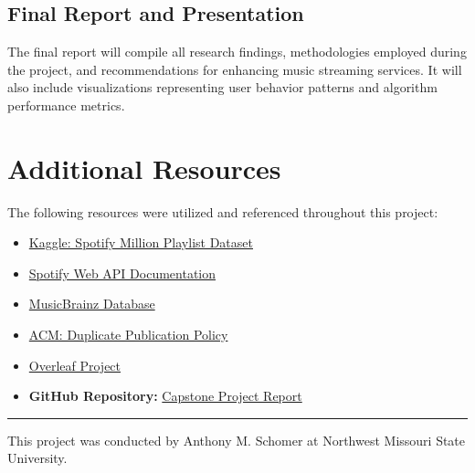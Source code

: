\documentclass[runningheads]{llncs}
\begin{document}
\subsection{Final Report and Presentation}
The final report will compile all research findings, methodologies employed during the project, and recommendations for enhancing music streaming services. It will also include visualizations representing user behavior patterns and algorithm performance metrics.




\section{Additional Resources}
The following resources were utilized and referenced throughout this project:

\begin{itemize}
    \item \href{https://www.kaggle.com/datasets/shubhendra/million-playlist-dataset}{Kaggle: Spotify Million Playlist Dataset}
    \item \href{https://developer.spotify.com/documentation/web-api/}{Spotify Web API Documentation}
    \item \href{https://musicbrainz.org/}{MusicBrainz Database}
    \item \href{https://www.acm.org/publications/policies/duplicate-publication}{ACM: Duplicate Publication Policy}
    \item \href{https://www.overleaf.com/project}{Overleaf Project}
    \item \textbf{GitHub Repository:} \href{https://github.com/anythonyschomer/Capstone-Project-Report}{Capstone Project Report}
\end{itemize}

\vspace{-1em} %
\rule{\textwidth}{0.4pt} %
\vspace{-0.5em} %
This project was conducted by Anthony M. Schomer at Northwest Missouri State University.
\end{document}

